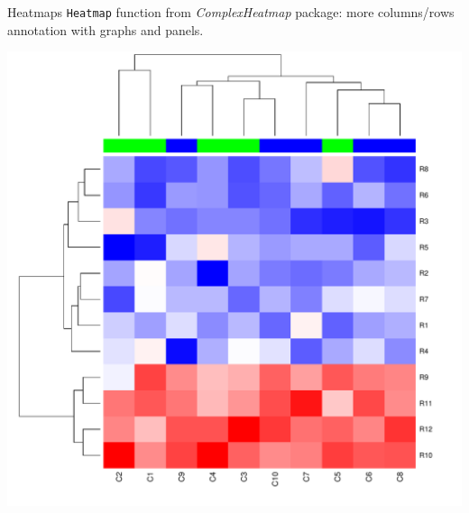 \documentclass[10pt]{beamer}
\begin{document}
\begin{frame}[fragile]{Heatmaps}
  \verb!Heatmap! function from {\it ComplexHeatmap} package: more columns/rows annotation with graphs and panels.
  \bigskip

  \centering
  \includegraphics[height=.8\textheight, page=3]{../imgs/heatmaps.pdf}

\end{frame}
\end{document}
